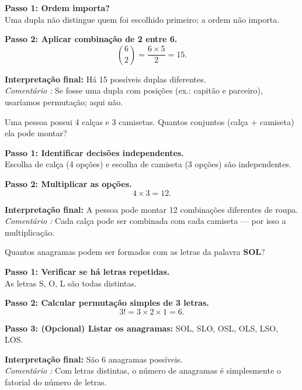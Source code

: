 \documentclass[11pt]{article}
\begin{document}
\begin{tcolorbox}[title=\textbf{Solução 6}, colback=green!6, colframe=green!60!black]
\textbf{Passo 1: Ordem importa?} \\
Uma dupla não distingue quem foi escolhido primeiro; a ordem não importa.

\textbf{Passo 2: Aplicar combinação de 2 entre 6.}\\
\[
\binom{6}{2} = \frac{6 \times 5}{2} = 15.
\]

\textbf{Interpretação final:} Há 15 possíveis duplas diferentes.\\
\emph{Comentário :} Se fosse uma dupla com posições (ex.: capitão e parceiro), usaríamos permutação; aqui não.
\end{tcolorbox}


\begin{tcolorbox}[title=\textbf{Questão 7}, colback=blue!6, colframe=blue!70!black]
Uma pessoa possui 4 calças e 3 camisetas. Quantos conjuntos (calça + camiseta) ela pode montar?
\end{tcolorbox}

\begin{tcolorbox}[title=\textbf{Solução 7}, colback=green!6, colframe=green!60!black]
\textbf{Passo 1: Identificar decisões independentes.}\\
Escolha de calça (4 opções) e escolha de camiseta (3 opções) são independentes.

\textbf{Passo 2: Multiplicar as opções.}\\
\[
4 \times 3 = 12.
\]

\textbf{Interpretação final:} A pessoa pode montar 12 combinações diferentes de roupa.\\
\emph{Comentário :} Cada calça pode ser combinada com cada camiseta — por isso a multiplicação.
\end{tcolorbox}


\begin{tcolorbox}[title=\textbf{Questão 8}, colback=blue!6, colframe=blue!70!black]
Quantos anagramas podem ser formados com as letras da palavra \textbf{SOL}?
\end{tcolorbox}

\begin{tcolorbox}[title=\textbf{Solução 8}, colback=green!6, colframe=green!60!black]
\textbf{Passo 1: Verificar se há letras repetidas.}\\
As letras S, O, L são todas distintas.

\textbf{Passo 2: Calcular permutação simples de 3 letras.}\\
\[
3! = 3 \times 2 \times 1 = 6.
\]

\textbf{Passo 3: (Opcional) Listar os anagramas:} SOL, SLO, OSL, OLS, LSO, LOS.

\textbf{Interpretação final:} São 6 anagramas possíveis.\\
\emph{Comentário :} Com letras distintas, o número de anagramas é simplesmente o fatorial do número de letras.
\end{tcolorbox}
\end{document}

